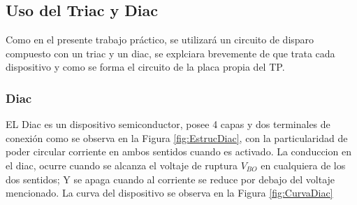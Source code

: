 \subsection{Uso del Triac y Diac}
    Como en el presente trabajo práctico, se utilizará un circuito de
    disparo compuesto con un triac y un diac, se explciara brevemente
    de que trata cada dispositivo y como se forma el circuito de la placa
    propia del TP. 
    
    \subsubsection{Diac}
        EL Diac es un dispositivo semiconductor, posee 4 capas y dos terminales de conexión
        como se observa en la Figura \ref{fig:EstrucDiac}, con la particularidad de poder 
        circular corriente en ambos sentidos cuando es activado. La conduccion en el diac,
        ocurre cuando se alcanza el voltaje de ruptura \(V_{BO}\) en cualquiera de los dos 
        sentidos; Y se apaga cuando al corriente se reduce por debajo del voltaje mencionado. 
        La curva del dispositivo se observa en la Figura \ref{fig:CurvaDiac} 

